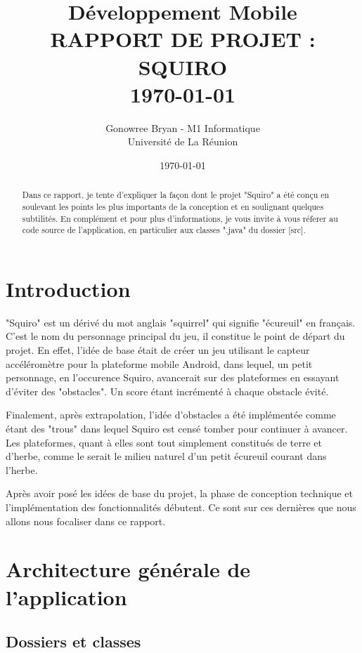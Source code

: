 \documentclass[12pt,a4paper,abstract=on,parskip=full]{scrartcl}
\title{ \normalsize Développement Mobile
        \HRule{0.5pt} \\ [0.5cm]
        \LARGE \textbf{\uppercase{Rapport de projet : SQUIRO}}
        \HRule{0.5pt} \\ [0.5cm]
        \normalsize \today \vspace*{5\baselineskip}}
\author{Gonowree Bryan - M1 Informatique \\ [0.5cm]
		Université de La Réunion}
\date{\today}
\begin{document}
\maketitle
\bigskip
\begin{abstract}
Dans ce rapport, je tente d'expliquer la façon dont le projet "Squiro" a été conçu en soulevant les points les plus importants de la conception et en soulignant quelques subtilités. En complément et pour plus d'informations, je vous invite à vous réferer au code source de l'application, en particulier aux classes ".java" du dossier [src].
\end{abstract}

\thispagestyle{empty}

\clearpage

\tableofcontents
\setcounter{page}{1}
\section*{Introduction}

"Squiro" est un dérivé du mot anglais "squirrel" qui signifie "écureuil" en français. C'est le nom du personnage principal du jeu, il constitue le point de départ du projet.
En effet, l'idée de base était de créer un jeu utilisant le capteur accéléromètre pour la plateforme mobile Android, dans lequel, un petit personnage, en l'occurence Squiro, avancerait sur des plateformes en essayant d'éviter des "obstacles". Un score étant incrémenté à chaque obstacle évité.

Finalement, après extrapolation, l'idée d'obstacles a été implémentée comme étant des "trous" dans lequel Squiro est censé tomber pour continuer à avancer. Les plateformes, quant à elles sont tout simplement constitués
de terre et d'herbe, comme le serait le milieu naturel d'un petit écureuil courant dans l'herbe. 

Après avoir posé les idées de base du projet,
la phase de conception technique et l'implémentation des fonctionnalités débutent.
Ce sont sur ces dernières que nous allons nous focaliser dans ce rapport.


\section{Architecture générale de l'application}
\subsection{Dossiers et classes}
\label{section:hello} %
\end{document}
